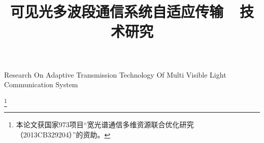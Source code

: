 \documentclass[master]{seuthesis} %
\begin{document}
\studentid{\quad{}}   %
\title{可见光多波段通信系统自适应传输\ \ 技术研究}{}{Research On Adaptive Transmission Technology Of Multi Visible Light Communication System}{}
\author{\quad{}}{\quad{}}
\advisor{\quad{}}{\quad{}}{\quad{}}{\quad{}}

\authorizedate{}
\address{东南大学四牌楼校区李文正楼}
\thanks{本论文获国家973项目“宽光谱通信多维资源联合优化研究（2013CB329204）”的资助。}
\maketitle




\tableofcontents
\listoffigures
\listoftables

\begin{Main}
   
   
   
   
   
   
\end{Main}



%
%
%
\end{document}
